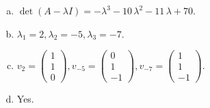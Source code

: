 \begin{questions}
\begin{solution}
\begin{enumerate}[(a)]
\item $\det(A-\lambda I)=-{\lambda}^{3} - 10 \, {\lambda}^{2} - 11 \, {\lambda} + 70$.
\item ${\lambda}_1=2, {\lambda}_2=-5, {\lambda}_3=-7$.
\item $v_{2}=\left(\begin{array}{r}
1 \\
1 \\
0
\end{array}\right), v_{-5}=\left(\begin{array}{r}
0 \\
1 \\
-1
\end{array}\right), v_{-7}=\left(\begin{array}{r}
1 \\
1 \\
-1
\end{array}\right)$.
\item Yes.
\end{enumerate}
\end{solution}

\end{questions}

\newpage


\begin{center}
\end{center}

